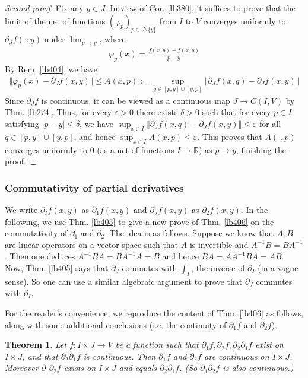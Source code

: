\documentclass[12pt,b5paper,notitlepage]{article}
\theoremstyle{definition}
\theoremstyle{plain}
\newtheorem{thm}[df]{Theorem}
\newcommand{\Rbb}{\mathbb R}
\newcommand{\eps}{\varepsilon}
\numberwithin{equation}{section}
\begin{document}
\begin{proof}[Second proof]
Fix any $y\in J$. In view of Cor. \ref{lb380}, it suffices to prove that the limit of the net of functions $(\varphi_p)_{p\in J\setminus\{y\}}$ from $I$ to $V$ converges uniformly to $\partial_Jf(\cdot,y)$ under $\lim_{p\rightarrow y}$, where
\begin{align*}
\varphi_p(x)=\frac{f(x,p)-f(x,y)}{p-y}
\end{align*}
By Rem. \ref{lb404}, we have
\begin{align*}
\Vert \varphi_p(x)-\partial_Jf(x,y)\Vert\leq A(x,p):=\sup_{q\in[p,y]\cup[y,p]}\Vert \partial_Jf(x,q)-\partial_Jf(x,y)\Vert
\end{align*}
Since $\partial_Jf$ is continuous, it can be viewed as a continuous map $J\rightarrow C(I,V)$ by Thm. \ref{lb274}. Thus, for every $\eps>0$ there exists $\delta>0$ such that for every $p\in I$ satisfying $|p-y|\leq\delta$, we have $\sup_{x\in I}\Vert \partial_Jf(x,q)-\partial_Jf(x,y)\Vert\leq\eps$ for all $q\in[p,y]\cup[y,p]$, and hence $\sup_{x\in I}A(x,p)\leq\eps$. This proves that $A(\cdot,p)$ converges uniformly to $0$ (as a net of functions $I\rightarrow\Rbb$) as $p\rightarrow y$, finishing the proof.
\end{proof}




\subsubsection{Commutativity of partial derivatives}


We write $\partial_If(x,y)$ as $\partial_1f(x,y)$ and $\partial_Jf(x,y)$ as $\partial_2f(x,y)$. In the following, we use Thm. \ref{lb405} to give a new prove of Thm. \ref{lb406} on the commutativity of $\partial_1$ and $\partial_2$. The idea is as follows. Suppose we know that $A,B$ are linear operators on a vector space such that $A$ is invertible and $A^{-1}B=BA^{-1}$. Then one deduces $A^{-1}BA=BA^{-1}A=B$ and hence $BA=AA^{-1}BA=AB$. Now, Thm. \ref{lb405} says that $\partial_J$  commutes with $\int_I$, the inverse of $\partial_I$ (in a vague sense). So one can use a similar algebraic argument to prove that $\partial_J$ commutes with $\partial_I$.

For the reader's convenience, we reproduce the content of Thm. \ref{lb406} as follows, along with some additional conclusions (i.e. the continuity of $\partial_1f$ and $\partial_2f$).


\begin{thm}\label{lb407}
Let $f:I\times J\rightarrow V$ be a function such that $\partial_1f,\partial_2f,\partial_2\partial_1f$ exist on $I\times J$, and that $\partial_2\partial_1f$ is continuous. Then $\partial_1f$ and $\partial_2f$ are continuous on $I\times J$. Moreover $\partial_1\partial_2f$ exists on $I\times J$ and equals $\partial_2\partial_1f$. (So $\partial_1\partial_2f$ is also continuous.)
\end{thm}
\end{document}
